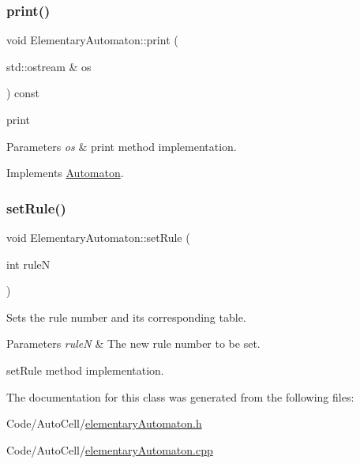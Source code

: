 \subsubsection{\texorpdfstring{print()}{print()}}
{\footnotesize\ttfamily void Elementary\+Automaton\+::print (\begin{DoxyParamCaption}\item[{std\+::ostream \&}]{os }\end{DoxyParamCaption}) const\hspace{0.3cm}{\ttfamily [virtual]}}



print 


\begin{DoxyParams}{Parameters}
{\em os} & print method implementation. \\
\hline
\end{DoxyParams}


Implements \mbox{\hyperlink{class_automaton_a33107fc96cfe40a75db43b7403dd3194}{Automaton}}.

\mbox{\label{class_elementary_automaton_a211959d8ca064251019c2f6c3ad2840a}} 
\subsubsection{\texorpdfstring{set\+Rule()}{setRule()}}
{\footnotesize\ttfamily void Elementary\+Automaton\+::set\+Rule (\begin{DoxyParamCaption}\item[{int}]{ruleN }\end{DoxyParamCaption})}

Sets the rule number and its corresponding table.


\begin{DoxyParams}{Parameters}
{\em ruleN} & The new rule number to be set.\\
\hline
\end{DoxyParams}
set\+Rule method implementation. 

The documentation for this class was generated from the following files\+:\begin{DoxyCompactItemize}
\item 
Code/\+Auto\+Cell/\mbox{\hyperlink{elementary_automaton_8h}{elementary\+Automaton.\+h}}\item 
Code/\+Auto\+Cell/\mbox{\hyperlink{elementary_automaton_8cpp}{elementary\+Automaton.\+cpp}}\end{DoxyCompactItemize}

